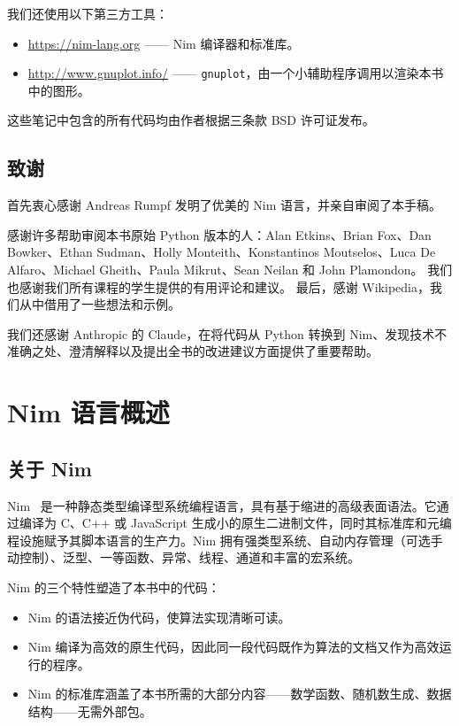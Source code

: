 \documentclass[justified, sixbynine]{tufte-book}
\def\ft{\small\tt}
\theoremstyle{plain}%
\newtheorem * {corollary}{推论}
\theoremstyle{definition}
\theoremstyle{remark}
\newtheorem * {remark}{注记}
\newtheorem * {note}{注释}
\begin{document}
\begin{fullwidth}
我们还使用以下第三方工具：

\begin{itemize}
\item \url{https://nim-lang.org} —— Nim 编译器和标准库。
\item \url{http://www.gnuplot.info/} —— {\ft gnuplot}，由一个小辅助程序调用以渲染本书中的图形。
\end{itemize}

这些笔记中包含的所有代码均由作者根据三条款 BSD 许可证发布。

\section*{致谢}

首先衷心感谢 Andreas Rumpf 发明了优美的 Nim 语言，并亲自审阅了本手稿。

感谢许多帮助审阅本书原始 Python 版本的人：Alan Etkins、Brian Fox、Dan Bowker、Ethan Sudman、Holly Monteith、Konstantinos Moutselos、Luca De Alfaro、Michael Gheith、Paula Mikrut、Sean Neilan 和 John Plamondon。
我们也感谢我们所有课程的学生提供的有用评论和建议。
最后，感谢 Wikipedia，我们从中借用了一些想法和示例。

我们还感谢 Anthropic 的 Claude，在将代码从 Python 转换到 Nim、发现技术不准确之处、澄清解释以及提出全书的改进建议方面提供了重要帮助。

\goodbreak\chapter{Nim 语言概述}


\goodbreak\section{关于 Nim}

Nim~\cite{nim} 是一种静态类型编译型系统编程语言，具有基于缩进的高级表面语法。它通过编译为 C、C++ 或 JavaScript 生成小的原生二进制文件，同时其标准库和元编程设施赋予其脚本语言的生产力。Nim 拥有强类型系统、自动内存管理（可选手动控制）、泛型、一等函数、异常、线程、通道和丰富的宏系统。

Nim 的三个特性塑造了本书中的代码：
\begin{itemize}
\item Nim 的语法接近伪代码，使算法实现清晰可读。
\item Nim 编译为高效的原生代码，因此同一段代码既作为算法的文档又作为高效运行的程序。
\item Nim 的标准库涵盖了本书所需的大部分内容——数学函数、随机数生成、数据结构——无需外部包。
\end{itemize}


\end{fullwidth}
\end{document}
